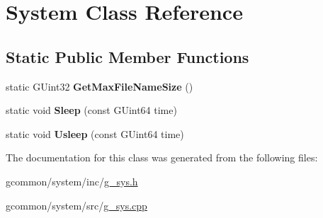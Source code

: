 \hypertarget{class_system}{\section{System Class Reference}
\label{class_system}
}
\subsection*{Static Public Member Functions}
\begin{DoxyCompactItemize}
\item 
\hypertarget{class_system_a704f31c13aa1de04ce0d34dea10b0dda}{static G\-Uint32 {\bfseries Get\-Max\-File\-Name\-Size} ()}\label{class_system_a704f31c13aa1de04ce0d34dea10b0dda}

\item 
\hypertarget{class_system_af6e9b708e97564cbbd58148dda05e685}{static void {\bfseries Sleep} (const G\-Uint64 time)}\label{class_system_af6e9b708e97564cbbd58148dda05e685}

\item 
\hypertarget{class_system_a71ff1dbec0bd7c641e68b4864d273f6c}{static void {\bfseries Usleep} (const G\-Uint64 time)}\label{class_system_a71ff1dbec0bd7c641e68b4864d273f6c}

\end{DoxyCompactItemize}


The documentation for this class was generated from the following files\-:\begin{DoxyCompactItemize}
\item 
gcommon/system/inc/\hyperlink{g__sys_8h}{g\-\_\-sys.\-h}\item 
gcommon/system/src/\hyperlink{g__sys_8cpp}{g\-\_\-sys.\-cpp}\end{DoxyCompactItemize}
